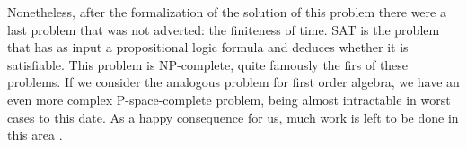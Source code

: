 Nonetheless, after the formalization of the solution of this problem there were a last problem that was not adverted: the finiteness of time. SAT is the problem that has as input a propositional logic formula and deduces whether it is satisfiable. This problem is NP-complete, quite famously the firs of these problems\cite{cook1971complexity}. If we consider the analogous problem for first order algebra, we have an even more complex P-space-complete problem, being almost intractable in worst cases to this date. As a happy consequence for us, much work is left to be done in this area \cite{cook2006p}. 


